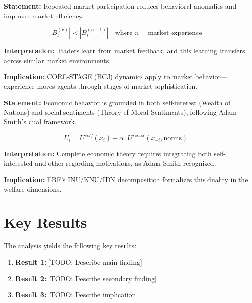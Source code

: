 \begin{tcolorbox}[colback=gray!5!white, colframe=gray!75!black,
    title=Axiom VS-5: Experience Learning]
\textbf{Statement:} Repeated market participation reduces behavioral anomalies
and improves market efficiency.

\begin{equation}
|B_t^{(n)}| < |B_t^{(n-1)}| \quad \text{where } n = \text{market experience}
\end{equation}

\textbf{Interpretation:} Traders learn from market feedback, and this learning
transfers across similar market environments.

\textbf{Implication:} CORE-STAGE (BCJ) dynamics apply to market behavior---
experience moves agents through stages of market sophistication.
\end{tcolorbox}

\begin{tcolorbox}[colback=gray!5!white, colframe=gray!75!black,
    title=Axiom VS-6: Humanomics]
\textbf{Statement:} Economic behavior is grounded in both self-interest (Wealth
of Nations) and social sentiments (Theory of Moral Sentiments), following Adam
Smith's dual framework.

\begin{equation}
U_i = U^{self}(x_i) + \alpha \cdot U^{social}(x_{-i}, \text{norms})
\end{equation}

\textbf{Interpretation:} Complete economic theory requires integrating both
self-interested and other-regarding motivations, as Adam Smith recognized.

\textbf{Implication:} EBF's INU/KNU/IDN decomposition formalizes this duality
in the welfare dimensions.
\end{tcolorbox}



\section{Key Results}
\label{sec:results}

The analysis yields the following key results:

\begin{enumerate}
    \item \textbf{Result 1:} [TODO: Describe main finding]
    \item \textbf{Result 2:} [TODO: Describe secondary finding]
    \item \textbf{Result 3:} [TODO: Describe implication]
\end{enumerate}

